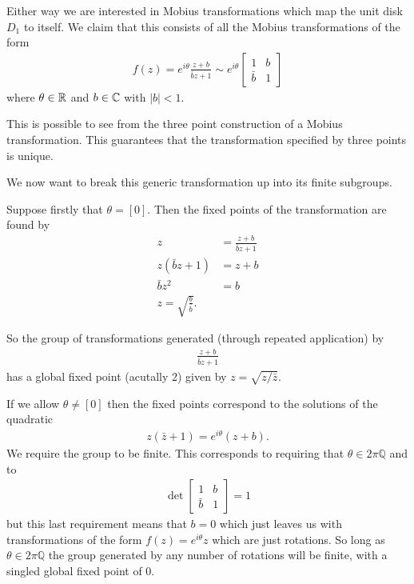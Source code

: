 \documentclass{unswmaths}
\begin{document}
Either way we are interested in Mobius transformations which map the unit disk $ D_1 $ to itself. We claim that this consists of all the Mobius transformations of the form
\begin{align}
	f(z) = e^{i\theta} \frac{z+b}{\bar{b} z + 1 } \sim e^{i\theta} \left[ \begin{array}{cc} 1 & b \\ \bar{b} & 1\end{array} \right]
\end{align}
where $ \theta \in \mathbb{R} $ and $ b \in \mathbb{C} $ with $ |b| < 1 $. 

This is possible to see from the three point construction of a Mobius transformation. This guarantees that the transformation specified by three points is unique. 

We now want to break this generic transformation up into its finite subgroups.

Suppose firstly that $ \theta = [0] $. Then the fixed points of the transformation are found by
\begin{align}
	z 	&= \frac{z + b}{\bar{b}z + 1} \\
	z(\bar{b}z + 1) &= z + b \\
	\bar{b}z^2 &= b \\
	z = \sqrt{\frac{b}{\bar{b}}}.
\end{align}

So the group of transformations generated (through repeated application) by
\begin{align}
	\frac{z+b}{\bar{b}{z} + 1}
\end{align}
has a global fixed point (acutally 2) given by $ z = \sqrt{ z / \bar{z}} $.

If we allow $ \theta \neq [0] $ then the fixed points correspond to the solutions of the quadratic
\begin{align}
	z(\bar{z} + 1) = e^{i\theta}(z+ b).
\end{align}
We require the group to be finite. This corresponds to 
requiring that $ \theta \in 2\pi \mathbb{Q} $ and to
\begin{align}
	\operatorname{det} \left[ \begin{array}{cc} 1 & b \\ \bar{b} & 1 \end{array} \right] = 1
\end{align} 
but this last requirement means that $ b = 0 $ which just leaves us with transformations of the form
$ f(z) = e^{i \theta} z $ which are just rotations. So long as $ \theta \in 2\pi\mathbb{Q} $ the group generated by any number of rotations will be finite, with a singled global fixed point of 0.
\end{document}
